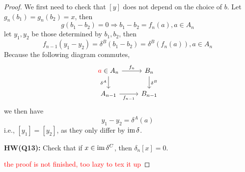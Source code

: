 \begin{proof}
    We first need to check that $[y]$ does not depend on the choice of $b$. Let $g_n(b_1)=g_n(b_2)=x$, then 
    \begin{equation*}
        g(b_1-b_2)=0\Rightarrow b_1-b_2=f_n(a), a\in A_n
    \end{equation*}
    let $y_1, y_2$ be those determined by $b_1, b_2$, then 
    \begin{equation*}
        f_{n-1}(y_1-y_2)=\delta^B(b_1-b_2)=\delta^B(f_n(a)), a\in A_n
    \end{equation*}
    Because the following diagram commutes,
    \[\begin{tikzcd}
        {\textcolor{red}{a}\in A_n} & {B_n} \\
        {A_{n-1}} & {B_{n-1}}
        \arrow["{f_n}", from=1-1, to=1-2]
        \arrow["{\delta^A}"', from=1-1, to=2-1]
        \arrow["{\delta^B}", from=1-2, to=2-2]
        \arrow["{f_{n-1}}"', from=2-1, to=2-2]
    \end{tikzcd}\]
    we then have 
    \begin{equation*}
        y_1-y_2=\delta^A(a)
    \end{equation*}
    i.e., $[y_1]=[y_2]$, as they only differ by $\operatorname{im}\delta$.

    \begin{prob}
        \textbf{HW(Q13):} Check that if $x\in\operatorname{im}\delta^C$, then $\delta_n[x]=0$.
    \end{prob}
    \textcolor{red}{the proof is not finished, too lazy to tex it up}
\end{proof}

